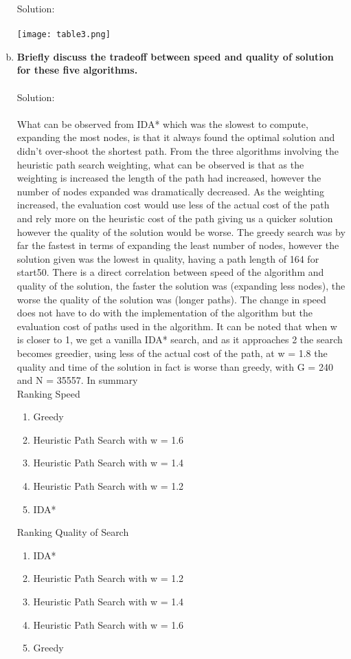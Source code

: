 \documentclass{article}
\newcommand*\fixindent{ \hspace{1pt}\\}
\begin{document}
\begin{enumerate}[a)]
    Solution:\\\\
    \texttt{[image: table3.png]}\\
    \item \textbf{Briefly discuss the tradeoff between speed and quality of solution for these five algorithms.}\fixindent{}\\
    Solution:\\\\
    What can be observed from IDA* which was the slowest to compute, expanding the most nodes, is that it always found the optimal solution and didn’t over-shoot the shortest path. From the three algorithms involving the heuristic path search weighting, what can be observed is that as the weighting is increased the length of the path had increased, however the number of nodes expanded was dramatically decreased. As the weighting increased, the evaluation cost would use less of the actual cost of the path and rely more on the heuristic cost of the path giving us a quicker solution however the quality of the solution would be worse. The greedy search was by far the fastest in terms of expanding the least number of nodes, however the solution given was the lowest in quality, having a path length of 164 for start50. There is a direct correlation between speed of the algorithm and quality of the solution, the faster the solution was (expanding less nodes), the worse the quality of the solution was (longer paths). The change in speed does not have to do with the implementation of the algorithm but the evaluation cost of paths used in the algorithm. It can be noted that when w is closer to 1, we get a vanilla IDA* search, and as it approaches 2 the search becomes greedier, using less of the actual cost of the path, at w = 1.8 the quality and time of the solution in fact is worse than greedy, with G = 240 and N = 35557. In summary\\
    Ranking Speed
    \begin{enumerate}[1.]
        \item Greedy
        \item Heuristic Path Search with w = 1.6
        \item Heuristic Path Search with w = 1.4
        \item Heuristic Path Search with w = 1.2
        \item IDA*
    \end{enumerate}
    Ranking Quality of Search
    \begin{enumerate}[1.]
        \item IDA*
        \item Heuristic Path Search with w = 1.2
        \item Heuristic Path Search with w = 1.4
        \item Heuristic Path Search with w = 1.6
        \item Greedy
    \end{enumerate}


\end{enumerate}
\end{document}
